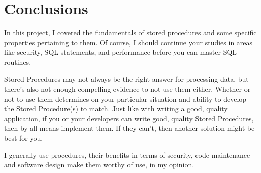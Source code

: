 \section*{Conclusions}

In this project, I covered the fundamentals of stored procedures and some specific properties pertaining to them. Of course, I should continue your studies in areas like security, SQL statements, and performance before you can master SQL routines.\par
Stored Procedures may not always be the right answer for processing data, but there’s also not enough compelling evidence to not use them either. Whether or not to use them determines on your particular situation and ability to develop the Stored Procedure(s) to match. Just like with writing a good, quality application, if you or your developers can write good, quality Stored Procedures, then by all means implement them. If they can’t, then another solution might be best for you.\par
I generally use procedures, their benefits in terms of security, code maintenance and software design make them worthy of use, in my opinion.

\clearpage